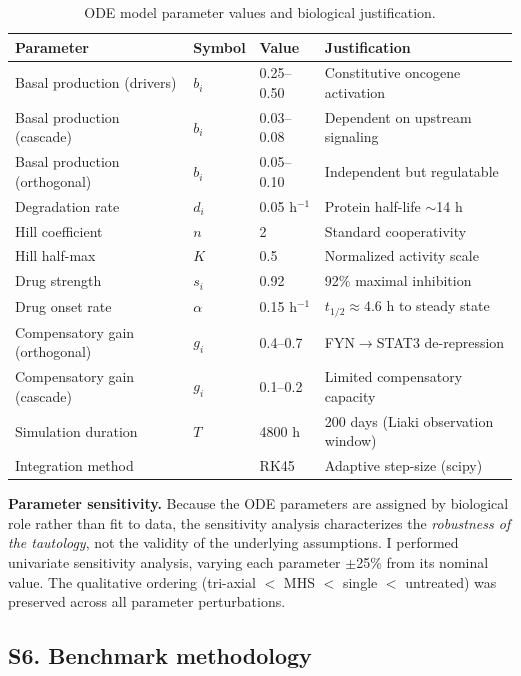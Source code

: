 \documentclass[11pt]{article}
\begin{document}
\begin{table}[htbp]
\centering
\small
\caption{ODE model parameter values and biological justification.}
\begin{tabular}{@{}llll@{}}
\toprule
\textbf{Parameter} & \textbf{Symbol} & \textbf{Value} & \textbf{Justification} \\
\midrule
Basal production (drivers) & $b_i$ & 0.25--0.50 & Constitutive oncogene activation \\
Basal production (cascade) & $b_i$ & 0.03--0.08 & Dependent on upstream signaling \\
Basal production (orthogonal) & $b_i$ & 0.05--0.10 & Independent but regulatable \\
Degradation rate & $d_i$ & 0.05 h$^{-1}$ & Protein half-life $\sim$14 h \\
Hill coefficient & $n$ & 2 & Standard cooperativity \\
Hill half-max & $K$ & 0.5 & Normalized activity scale \\
Drug strength & $s_i$ & 0.92 & 92\% maximal inhibition \\
Drug onset rate & $\alpha$ & 0.15 h$^{-1}$ & $t_{1/2} \approx 4.6$ h to steady state \\
Compensatory gain (orthogonal) & $g_i$ & 0.4--0.7 & FYN$\to$STAT3 de-repression \\
Compensatory gain (cascade) & $g_i$ & 0.1--0.2 & Limited compensatory capacity \\
Simulation duration & $T$ & 4800 h & 200 days (Liaki observation window) \\
Integration method & & RK45 & Adaptive step-size (scipy) \\
\bottomrule
\end{tabular}
\end{table}

\textbf{Parameter sensitivity.} Because the ODE parameters are assigned by biological role rather than fit to data, the sensitivity analysis characterizes the \emph{robustness of the tautology}, not the validity of the underlying assumptions. I performed univariate sensitivity analysis, varying each parameter $\pm$25\% from its nominal value. The qualitative ordering (tri-axial $<$ MHS $<$ single $<$ untreated) was preserved across all parameter perturbations.

\subsection{S6. Benchmark methodology}
\end{document}
